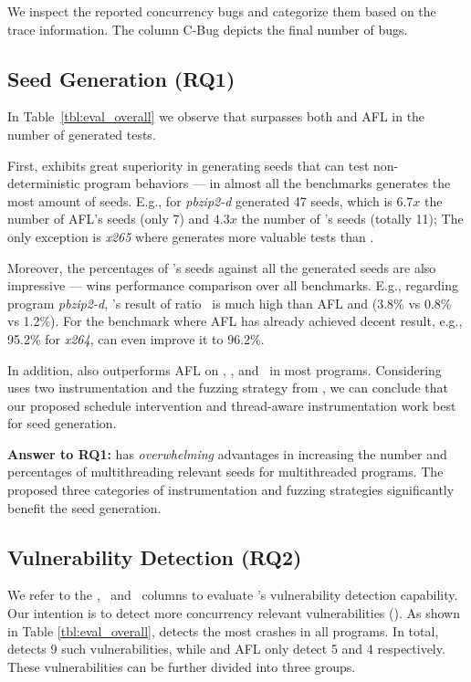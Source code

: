We inspect the reported concurrency bugs and categorize them based on the trace information. The 
column \textsf{C-Bug} depicts the final number of bugs. 

\subsection{Seed Generation (RQ1)}
In Table~\ref{tbl:eval_overall} we observe that \mtfuzz surpasses both \mtfuzzc and AFL in the 
number of generated tests. 

First, \mtfuzz exhibits great superiority in generating seeds that can test non-deterministic 
program behaviors --- in almost all the benchmarks \mtfuzz generates the most amount of seeds. 
E.g., for \emph{pbzip2-d} \mtfuzz generated 47 seeds, which is $6.7x$ the number of AFL's seeds 
(only 7) and $4.3x$ the number of \mtfuzzc's seeds (totally 11); The only exception is \emph{x265} 
where \mtfuzzc generates more valuable tests than \mtfuzz.

Moreover, the percentages of \mtfuzz's seeds against all the generated seeds are also impressive 
--- \mtfuzz wins performance comparison over all benchmarks. E.g., regarding program \emph{pbzip2-d}, 
\mtfuzz's result of ratio \testsRatio~is much high than AFL and \mtfuzzc (3.8\% vs 0.8\% vs 1.2\%). 
For the benchmark where AFL has already achieved decent result, e.g., 95.2\% for \emph{x264}, \mtfuzz 
can even improve it to 96.2\%. 

In addition, \mtfuzzc also outperforms AFL on \testsALL, \testsMT, and \testsRatio~in most programs. 
Considering \mtfuzzc uses two instrumentation and the fuzzing strategy from \mtfuzz, we can conclude 
that our proposed schedule intervention and thread-aware instrumentation work best for seed generation.






\begin{tcolorbox}[size=title]
{ \textbf{Answer to RQ1: } \mtfuzz has \emph{overwhelming} advantages in increasing the number and 
percentages of multithreading relevant seeds for multithreaded programs. The proposed three categories of instrumentation and fuzzing strategies significantly benefit the seed generation.}
\end{tcolorbox}



\subsection{Vulnerability Detection (RQ2)}
We refer to the \vulsNUM, \vulsMT~and \vulsST~columns to evaluate \mtfuzz's vulnerability
detection capability. Our intention is to detect more concurrency relevant vulnerabilities 
(\vulsMT). As shown in Table \ref{tbl:eval_overall}, \mtfuzz detects the most 
crashes in all programs. In total, \mtfuzz detects 9 such vulnerabilities, while \mtfuzzc and AFL only detect 5 and 4 respectively.
These vulnerabilities can be further divided into three groups.

